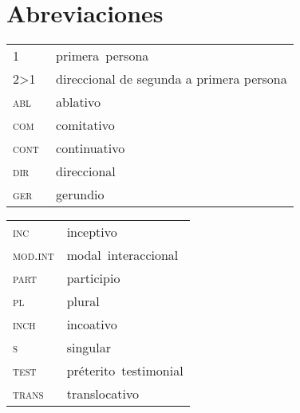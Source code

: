 \documentclass[output=paper]{../langscibook}
\begin{document}
\section*{Abreviaciones}
\begin{tabularx}{.45\textwidth}{lQ}
1 &primera~persona                                 \\
2>1 &       direccional de segunda a primera persona      \\
\textsc{abl}    &ablativo                               \\
\textsc{com}    &comitativo                             \\
\textsc{cont} ​​&    continuativo                       \\
\textsc{dir}    &direccional                            \\
\textsc{ger}    & gerundio                              \\
\end{tabularx}
\begin{tabularx}{.45\textwidth}{lQ}
\textsc{inc}    &inceptivo                              \\
\textsc{mod.int}&  modal~interaccional                  \\
\textsc{part}  ​&participio                          \\
\textsc{pl​​}   & plural                                \\
\textsc{inch}   & incoativo                            \\
\textsc{s}​​    &singular                               \\
\textsc{test​} &  ​préterito~testimonial                \\
\textsc{trans} &  translocativo                         \\
\end{tabularx}

\sloppy\printbibliography[heading=subbibliography,notkeyword=this]
\end{document}
